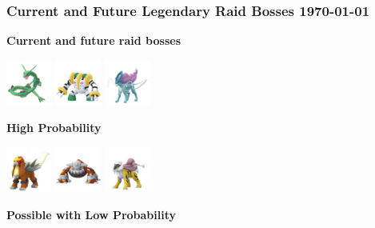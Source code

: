 \documentclass[12pt]{beamer}
\begin{document}
\begin{frame}
\frametitle{Current and Future Legendary Raid Bosses \hspace{3cm} \today}

\begin{block}{}
\begin{footnotesize}

\begin{center}
\textbf{Current and future raid bosses}

 \includegraphics[width=1.5cm]{../../images/pokemon/rayquaza.png}\quad\quad
 \includegraphics[width=1.5cm]{../../images/pokemon/regigigas.png}\quad\quad
 \includegraphics[width=1.5cm]{../../images/pokemon/suicune.png}

\bigskip\bigskip

\textbf{High Probability}

\quad\quad
 \includegraphics[width=1.5cm]{../../images/pokemon/entei.png}\quad\quad
 \includegraphics[width=1.5cm]{../../images/pokemon/heatran.png}\quad\quad
 \includegraphics[width=1.5cm]{../../images/pokemon/raikou.png}
 
\bigskip\bigskip
 
\textbf{Possible with Low Probability}
 

\end{center}
\end{footnotesize}
\end{block}
\end{frame}
\end{document}
